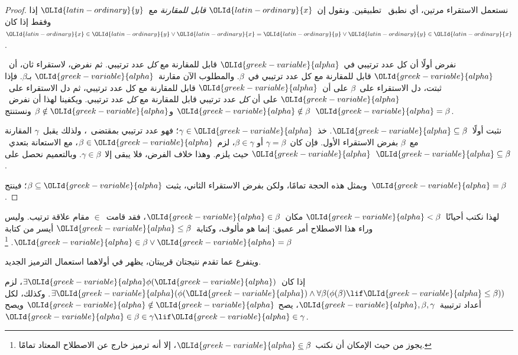 \documentclass[../../../include/open-logic-section]{subfiles}
\begin{document}
\begin{proof}
نستعمل الاستقراء مرتين، أي نطبق~ تطبيقين.
ونقول إن~$\OLId{latin-ordinary}{x}$ \emph{قابل للمقارنة} مع~$\OLId{latin-ordinary}{y}$ إذا وفقط إذا كان
$\OLId{latin-ordinary}{x} \in \OLId{latin-ordinary}{y} \lor \OLId{latin-ordinary}{x} = \OLId{latin-ordinary}{y} \lor \OLId{latin-ordinary}{y} \in \OLId{latin-ordinary}{x}$.

نفرض أولًا أن كل عدد ترتيبي في~$\OLId{greek-variable}{alpha}$ قابل للمقارنة مع \emph{كل}
عدد ترتيبي. ثم نفرض، لاستقراء ثان، أن~$\OLId{greek-variable}{alpha}$ قابل للمقارنة مع كل
عدد ترتيبي في~$\beta$. والمطلوب الآن مقارنة~$\OLId{greek-variable}{alpha}$ بـ$\beta$.
فإذا ثبتت، دل الاستقراء على~$\beta$ على أن~$\OLId{greek-variable}{alpha}$ قابل للمقارنة
مع كل عدد ترتيبي، ثم دل الاستقراء على~$\OLId{greek-variable}{alpha}$ على أن \emph{كل}
عدد ترتيبي قابل للمقارنة مع \emph{كل} عدد ترتيبي. ويكفينا لهذا أن
نفرض~$\OLId{greek-variable}{alpha} \notin \beta$ و$\beta \notin \OLId{greek-variable}{alpha}$ ونستنتج~$\OLId{greek-variable}{alpha} = \beta$.

نثبت أولًا~$\OLId{greek-variable}{alpha} \subseteq \beta$. خذ~$\gamma \in \OLId{greek-variable}{alpha}$؛ فهو
عدد ترتيبي بمقتضى~، ولذلك يقبل~$\gamma$ المقارنة
مع~$\beta$ بفرض الاستقراء الأول. فإن كان~$\gamma = \beta$ أو
$\beta \in \gamma$، لزم~$\beta \in \OLId{greek-variable}{alpha}$، مع الاستعانة بتعدي~$\OLId{greek-variable}{alpha}$
حيث يلزم. وهذا خلاف الفرض، فلا يبقى إلا~$\gamma \in \beta$.
وبالتعميم نحصل على~$\OLId{greek-variable}{alpha} \subseteq \beta$.

وبمثل هذه الحجة تمامًا، ولكن بفرض الاستقراء الثاني، يثبت
$\beta \subseteq \OLId{greek-variable}{alpha}$؛ فينتج~$\OLId{greek-variable}{alpha} = \beta$.
\end{proof}\noindent
لهذا نكتب أحيانًا~$\OLId{greek-variable}{alpha} <\beta$ مكان~$\OLId{greek-variable}{alpha} \in \beta$، فقد
قامت~$\in$ مقام علاقة ترتيب. وليس وراء هذا الاصطلاح أمر عميق:
إنما هو مألوف، وكتابة~$\OLId{greek-variable}{alpha} \leq \beta$ أيسر من كتابة
$\OLId{greek-variable}{alpha} \in \beta \lor \OLId{greek-variable}{alpha} = \beta$.
\footnote{يجوز من حيث الإمكان أن نكتب~$\OLId{greek-variable}{alpha} \mathrel{\underline{\in}} \beta$،
إلا أنه ترميز خارج عن الاصطلاح المعتاد تمامًا.}

ويتفرع عما تقدم نتيجتان قريبتان، يظهر في أولاهما استعمال الترميز الجديد.

\begin{cor}
إذا كان~$\exists \OLId{greek-variable}{alpha}\phi(\OLId{greek-variable}{alpha})$، لزم
$\exists \OLId{greek-variable}{alpha}(\phi(\OLId{greek-variable}{alpha}) \land \forall \beta(\phi(\beta) \lif \OLId{greek-variable}{alpha} \leq \beta))$.
وكذلك، لكل أعداد ترتيبية~$\OLId{greek-variable}{alpha}, \beta, \gamma$، يصح
$\OLId{greek-variable}{alpha} \notin \OLId{greek-variable}{alpha}$ ويصح~$\OLId{greek-variable}{alpha} \in \beta \in \gamma \lif \OLId{greek-variable}{alpha} \in \gamma$.
\end{cor}
\end{document}
